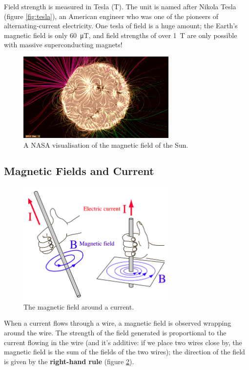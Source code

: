 \documentclass[a4paper]{amsbook}
\newcommand\capcite[1]{}
\begin{document}
Field strength is measured in Tesla (T). The unit is named after Nikola Tesla (figure \ref{fig:tesla}), an American engineer who was one of the
pioneers of alternating-current electricity. One tesla of field is a huge amount; the Earth's magnetic field is only \SI{60}{\micro\tesla},
and field strengths of over \SI{1}{\tesla} are only possible with massive superconducting magnets!

\begin{figure}
  \centering
  \includegraphics[width=0.7\textwidth]{sunmagfield}
  \caption{A NASA visualisation of the magnetic field of the Sun. \capcite{https://www.nasa.gov/sites/default/files/thumbnails/image/magnetic-dynamic-sun.jpg}\label{fig:sunmagfield}}
\end{figure}

\subsection{Magnetic Fields and Current}
\begin{figure}
  \centering
  \includegraphics[width=0.7\textwidth]{magfield2}
  \caption{The magnetic field around a current. \capcite{http://hyperphysics.phy-astr.gsu.edu/hbase/magnetic/imgmag/magcur.gif}\label{fig:rhr1}}
\end{figure}
When a current flows through a wire, a magnetic field is observed wrapping around the wire. The strength of the field generated is proportional
to the current flowing in the wire (and it's additive: if we place two wires close by, the magnetic field is the sum of the fields of the two
wires); the direction of the field is given by the \textbf{right-hand rule} (figure \ref{fig:rhr1}).
\end{document}
